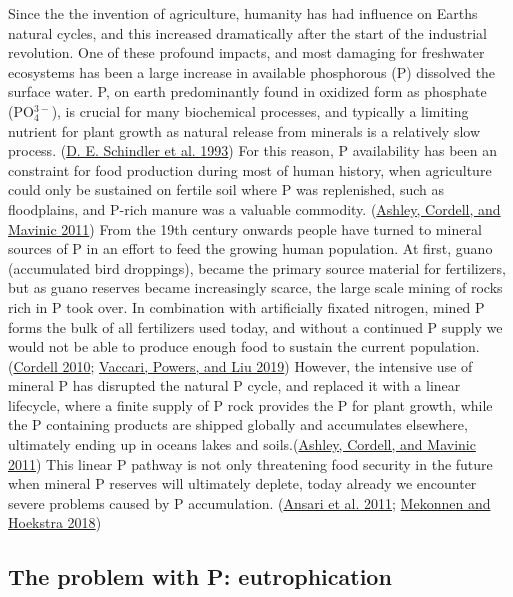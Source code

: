 \documentclass[a4paper,11pt]{article}
\begin{document}
Since the the invention of agriculture, humanity has had influence on Earths natural cycles, and this increased dramatically after the start of the industrial revolution. One of these profound impacts, and most damaging for freshwater ecosystems has been a large increase in available phosphorous (P) dissolved the surface water. P, on earth predominantly found in oxidized form as phosphate (PO\(_4^{3-}\)), is crucial for many biochemical processes, and typically a limiting nutrient for plant growth as natural release from minerals is a relatively slow process. (\protect\hyperlink{ref-schindlerFoodWebStructure1993}{D. E. Schindler et al. 1993}) For this reason, P availability has been an constraint for food production during most of human history, when agriculture could only be sustained on fertile soil where P was replenished, such as floodplains, and P-rich manure was a valuable commodity. (\protect\hyperlink{ref-ashleyBriefHistoryPhosphorus2011}{Ashley, Cordell, and Mavinic 2011}) From the 19th century onwards people have turned to mineral sources of P in an effort to feed the growing human population. At first, guano (accumulated bird droppings), became the primary source material for fertilizers, but as guano reserves became increasingly scarce, the large scale mining of rocks rich in P took over. In combination with artificially fixated nitrogen, mined P forms the bulk of all fertilizers used today, and without a continued P supply we would not be able to produce enough food to sustain the current population. (\protect\hyperlink{ref-cordell2010}{Cordell 2010}; \protect\hyperlink{ref-vaccariDemandDrivenModelGlobal2019}{Vaccari, Powers, and Liu 2019}) However, the intensive use of mineral P has disrupted the natural P cycle, and replaced it with a linear lifecycle, where a finite supply of P rock provides the P for plant growth, while the P containing products are shipped globally and accumulates elsewhere, ultimately ending up in oceans lakes and soils.(\protect\hyperlink{ref-ashleyBriefHistoryPhosphorus2011}{Ashley, Cordell, and Mavinic 2011}) This linear P pathway is not only threatening food security in the future when mineral P reserves will ultimately deplete, today already we encounter severe problems caused by P accumulation. (\protect\hyperlink{ref-ansariEutrophicationCausesConsequences2011}{Ansari et al. 2011}; \protect\hyperlink{ref-mekonnenGlobalAnthropogenicPhosphorus2018}{Mekonnen and Hoekstra 2018})

\hypertarget{the-problem-with-p-eutrophication}{%
\subsection{The problem with P: eutrophication}\label{the-problem-with-p-eutrophication}}
\end{document}
